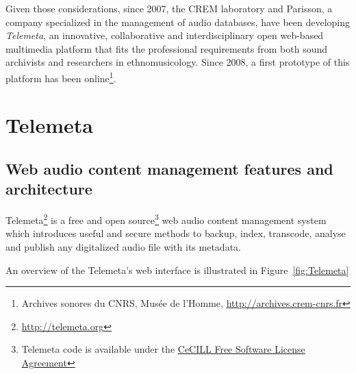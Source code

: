 \documentclass[runningheads,a4paper]{llncs}
\begin{document}
Given those considerations, since 2007, the CREM laboratory and Parisson, a company specialized in the management of audio databases, have been developing \emph{Telemeta}, an innovative, collaborative and interdisciplinary open web-based multimedia platform that fits the professional requirements from both sound archivists and researchers in ethnomusicology. Since 2008, a first prototype of this platform has been online\footnote{Archives sonores du CNRS, Musée de l'Homme, \url{http://archives.crem-cnrs.fr}}.






\section{Telemeta}\label{sec:Telemeta}
\subsection{Web audio content management features and architecture}
Telemeta\footnote{\url{http://telemeta.org}} is a free and open source\footnote{Telemeta code is available under the \href{http://cecill.info/licences/Licence_CeCILL_V2-en.html}{CeCILL Free Software License Agreement}} web audio content management system which introduces useful and secure methods to backup, index, transcode, analyse and publish any digitalized audio file with its metadata. 

An overview of the Telemeta's web interface is illustrated in Figure~\ref{fig:Telemeta}
\end{document}
